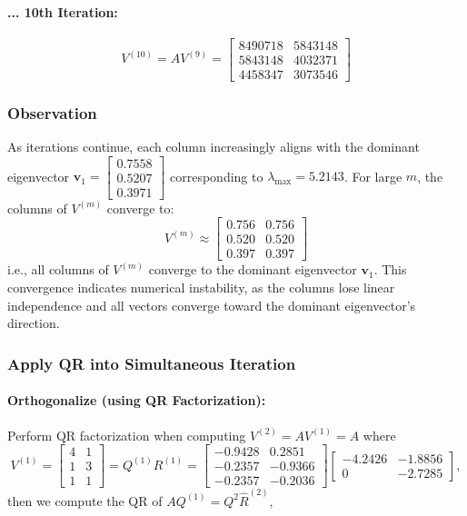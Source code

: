 \documentclass[12pt]{article}
\begin{document}
\paragraph{... 10th Iteration:}

$$
V^{(10)} = A V^{(9)} = \begin{bmatrix} 8490718 & 5843148 \\ 5843148 & 4032371 \\ 4458347 & 3073546 \end{bmatrix}
$$

\subsubsection*{Observation}

As iterations continue, each column increasingly aligns with the dominant eigenvector $\mathbf{v}_1 = \begin{bmatrix} 0.7558 \\ 0.5207 \\ 0.3971 \end{bmatrix}$ corresponding to $\lambda_{\max} = 5.2143$. For large $ m $, the columns of $ V^{(m)} $ converge to:
$$
V^{(m)} \approx \begin{bmatrix} 0.756 & 0.756 \\ 0.520 & 0.520 \\ 0.397 & 0.397 \end{bmatrix}
$$
i.e., all columns of $ V^{(m)} $ converge to the dominant eigenvector $\mathbf{v}_1$.
This convergence indicates numerical instability, as the columns lose linear independence and all vectors converge toward the dominant eigenvector's direction.

\subsubsection*{Apply QR into Simultaneous Iteration}

\paragraph{Orthogonalize (using QR Factorization):}

Perform QR factorization when computing $V^{(2)}= AV^{(1)} = A$ where
$$
V^{(1)} = \begin{bmatrix} 4 & 1 \\ 1 & 3 \\ 1 & 1 \end{bmatrix} =Q^{(1)}R^{(1)}=  \begin{bmatrix}
-0.9428 & 0.2851 \\
-0.2357 & -0.9366 \\
-0.2357 & -0.2036
\end{bmatrix} \begin{bmatrix}
-4.2426 & -1.8856 \\
0 & -2.7285
\end{bmatrix},
$$
then we compute the QR of $AQ^{(1)} = Q^{2} \hat{R}^{(2)}$,
\end{document}
